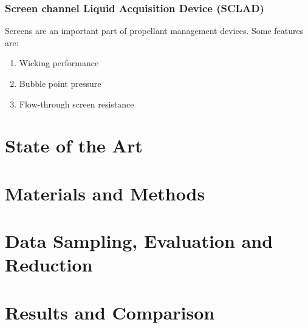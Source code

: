 \documentclass[12pt,twoside]{report}
\begin{document}
\subsection{Screen channel Liquid Acquisition Device (SCLAD)}
Screens are an important part of propellant management devices. Some features are:
\begin{enumerate}
	\item Wicking performance
	\item Bubble point pressure 
	\item Flow-through screen resistance 
\end{enumerate}
\chapter{State of the Art}
	
\chapter{Materials and Methods}
	
\chapter{Data Sampling, Evaluation and Reduction}
	
\chapter{Results and Comparison}



\printnomenclature
\end{document}
